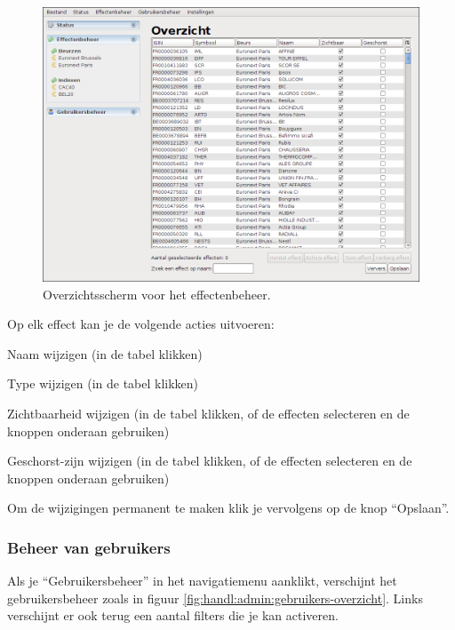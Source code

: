 \begin{figure}[h!]
	\centering
		\includegraphics[width=\textwidth]{images/handleiding/administratie/effecten-overzicht}
	\caption{Overzichtsscherm voor het effectenbeheer.}
		\label{fig:handl:admin:effecten-overzicht}
\end{figure}

Op elk effect kan je de volgende acties uitvoeren:

\begin{itemize_compact}
\item{Naam wijzigen (in de tabel klikken)}
\item{Type wijzigen (in de tabel klikken)}
\item{Zichtbaarheid wijzigen (in de tabel klikken, of de effecten selecteren en de knoppen onderaan gebruiken)}
\item{Geschorst-zijn wijzigen (in de tabel klikken, of de effecten selecteren en de knoppen onderaan gebruiken)}
\end{itemize_compact}

Om de wijzigingen permanent te maken klik je vervolgens op de knop ``Opslaan''.

\subsubsection{Beheer van gebruikers}
\label{sec:handl:admin:gebruikers}

Als je ``Gebruikersbeheer'' in het navigatiemenu aanklikt, verschijnt het gebruikersbeheer zoals in figuur \ref{fig:handl:admin:gebruikers-overzicht}.
Links verschijnt er ook terug een aantal filters die je kan activeren.

